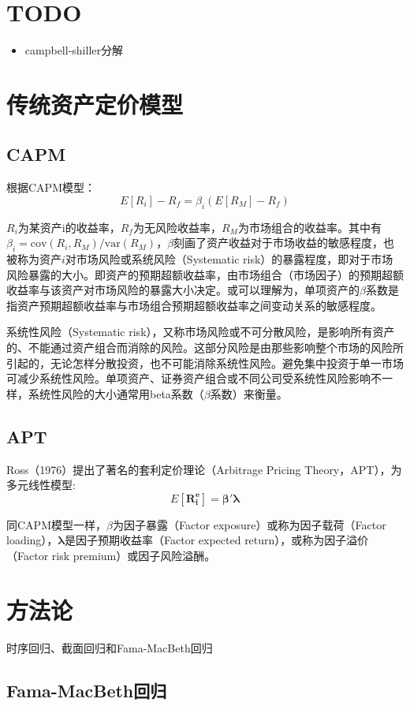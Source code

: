 \documentclass[11pt]{article}
\begin{document}
\maketitle
\tableofcontents

\section{TODO}
\begin{itemize}
    \item campbell-shiller分解
\end{itemize}

\section{传统资产定价模型}

\subsection{CAPM}

根据CAPM模型：
\begin{equation*}
    E[R_i] - R_f = \beta_i(E[R_M]-R_f)
\end{equation*}

$R_i$为某资产i的收益率，$R_f$为无风险收益率，$R_M$为市场组合的收益率。其中有$\beta_i = \text{cov}(R_i,R_M)/\text{var}(R_M)$，$\beta$刻画了资产收益对于市场收益的敏感程度，也被称为资产$i$对市场风险或系统风险（Systematic risk）的暴露程度，即对于市场风险暴露的大小。即资产的预期超额收益率，由市场组合（市场因子）的预期超额收益率与该资产对市场风险的暴露大小决定。或可以理解为，单项资产的$\beta$系数是指资产预期超额收益率与市场组合预期超额收益率之间变动关系的敏感程度。

系统性风险（Systematic risk），又称市场风险或不可分散风险，是影响所有资产的、不能通过资产组合而消除的风险。这部分风险是由那些影响整个市场的风险所引起的，无论怎样分散投资，也不可能消除系统性风险。避免集中投资于单一市场可减少系统性风险。单项资产、证券资产组合或不同公司受系统性风险影响不一样，系统性风险的大小通常用beta系数（$\beta$系数）来衡量。

\subsection{APT}

Ross（1976）提出了著名的套利定价理论（Arbitrage Pricing Theory，APT），为多元线性模型:
\begin{equation*}
    E[\bm{R_i^e}] = \bm{\beta' \lambda}
\end{equation*}

同CAPM模型一样，$\mathbb{\beta}$为因子暴露（Factor exposure）或称为因子载荷（Factor loading），$\bm{\lambda}$是因子预期收益率（Factor expected return），或称为因子溢价（Factor risk premium）或因子风险溢酬。


\section{方法论}

时序回归、截面回归和Fama-MacBeth回归

\subsection{Fama-MacBeth回归}
\end{document}
